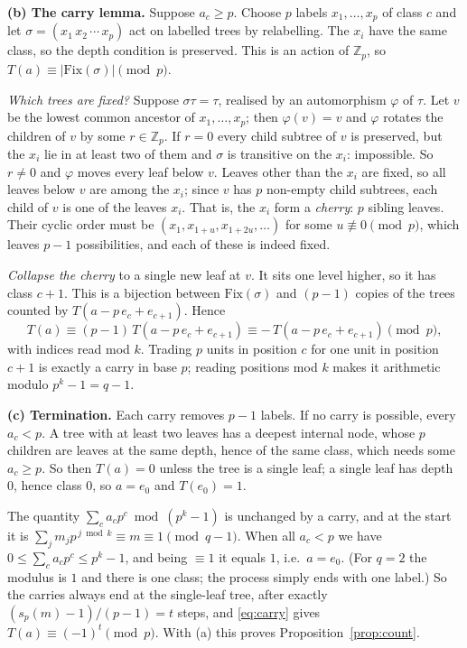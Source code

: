 \documentclass[11pt]{article}
\theoremstyle{definition}
\newcommand{\sd}{s_p}
\newcommand{\Z}{\mathbb{Z}}
\begin{document}
\textbf{(b) The carry lemma.} Suppose $a_c\ge p$. Choose $p$ labels $x_1,\dots,x_p$ of class
$c$ and let $\sigma=(x_1\,x_2\,\cdots\,x_p)$ act on labelled trees by relabelling. The $x_i$
have the same class, so the depth condition is preserved. This is an action of $\Z_p$, so
$T(a)\equiv|\mathrm{Fix}(\sigma)|\pmod p$.

\emph{Which trees are fixed?} Suppose $\sigma\tau=\tau$, realised by an automorphism
$\varphi$ of $\tau$. Let $v$ be the lowest common ancestor of $x_1,\dots,x_p$; then
$\varphi(v)=v$ and $\varphi$ rotates the children of $v$ by some $r\in\Z_p$. If $r=0$ every
child subtree of $v$ is preserved, but the $x_i$ lie in at least two of them and $\sigma$ is
transitive on the $x_i$: impossible. So $r\ne0$ and $\varphi$ moves every leaf below $v$.
Leaves other than the $x_i$ are fixed, so all leaves below $v$ are among the $x_i$; since $v$
has $p$ non-empty child subtrees, each child of $v$ is one of the leaves $x_i$. That is, the
$x_i$ form a \emph{cherry}: $p$ sibling leaves. Their cyclic order must be
$(x_1,x_{1+u},x_{1+2u},\dots)$ for some $u\not\equiv 0 \pmod p$, which leaves $p-1$
possibilities, and each of these is indeed fixed.

\emph{Collapse the cherry} to a single new leaf at $v$. It sits one level higher, so it has
class $c+1$. This is a bijection between $\mathrm{Fix}(\sigma)$ and $(p-1)$ copies of the
trees counted by $T(a-p\,e_c+e_{c+1})$. Hence
\begin{equation}\label{eq:carry}
  T(a)\equiv(p-1)\,T(a-p\,e_c+e_{c+1})\equiv -\,T(a-p\,e_c+e_{c+1})\pmod p,
\end{equation}
with indices read mod $k$. Trading $p$ units in position $c$ for one unit in position $c+1$
is exactly a carry in base $p$; reading positions mod $k$ makes it arithmetic modulo
$p^k-1=q-1$.

\textbf{(c) Termination.} Each carry removes $p-1$ labels. If no carry is possible, every
$a_c<p$. A tree with at least two leaves has a deepest internal node, whose $p$ children are
leaves at the same depth, hence of the same class, which needs some $a_c\ge p$. So then
$T(a)=0$ unless the tree is a single leaf; a single leaf has depth $0$, hence class $0$, so
$a=e_0$ and $T(e_0)=1$.

The quantity $\sum_c a_c p^c \bmod (p^k-1)$ is unchanged by a carry, and at the start it is
$\sum_j m_j p^{\,j \bmod k}\equiv m\equiv 1\pmod{q-1}$. When all $a_c<p$ we have
$0\le\sum_c a_cp^c\le p^k-1$, and being $\equiv1$ it equals $1$, i.e.\ $a=e_0$. (For $q=2$
the modulus is $1$ and there is one class; the process simply ends with one label.) So the
carries always end at the single-leaf tree, after exactly $(\sd(m)-1)/(p-1)=t$ steps, and
\eqref{eq:carry} gives $T(a)\equiv(-1)^t\pmod p$. With (a) this proves
Proposition~\ref{prop:count}.
\end{document}
